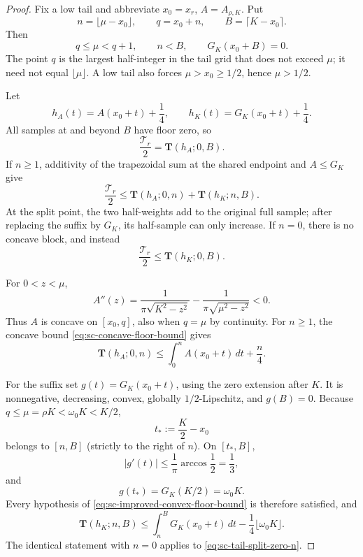 \documentclass[11pt]{article}
\numberwithin{equation}{section}
\theoremstyle{definition}
\theoremstyle{remark}
\begin{document}
\begin{proof}
Fix a low tail and abbreviate \(x_0=x_r\), \(A=A_{\rho,K}\).  Put
\begin{equation}
  n=\lfloor\mu-x_0\rfloor,
  \qquad q=x_0+n,
  \qquad B=\lceil K-x_0\rceil.
  \label{eq:sc-interface-bookkeeping}
\end{equation}
Then
\[
  q\le\mu<q+1,
  \qquad n<B,
  \qquad G_K(x_0+B)=0.
\]
The point \(q\) is the largest half-integer in the tail grid that does not
exceed \(\mu\); it need not equal \(\lfloor\mu\rfloor\).  A low tail also
forces \(\mu>x_0\ge1/2\), hence \(\mu>1/2\).

Let
\[
  h_A(t)=A(x_0+t)+\frac14,
  \qquad h_K(t)=G_K(x_0+t)+\frac14.
\]
All samples at and beyond \(B\) have floor zero, so
\[
  \frac{\mathcal T_r}{2}=\mathbf T(h_A;0,B).
\]
If \(n\ge1\), additivity of the trapezoidal sum at the shared endpoint and
\(A\le G_K\) give
\begin{equation}
  \frac{\mathcal T_r}{2}
  \le\mathbf T(h_A;0,n)+\mathbf T(h_K;n,B).
  \label{eq:sc-tail-split-positive-n}
\end{equation}
At the split point, the two half-weights add to the original full sample;
after replacing the suffix by \(G_K\), its half-sample can only increase.
If \(n=0\), there is no concave block, and instead
\begin{equation}
  \frac{\mathcal T_r}{2}\le\mathbf T(h_K;0,B).
  \label{eq:sc-tail-split-zero-n}
\end{equation}

For \(0<z<\mu\),
\begin{equation}
  A''(z)=\frac1{\pi\sqrt{K^2-z^2}}
  -\frac1{\pi\sqrt{\mu^2-z^2}}<0.
  \label{eq:sc-action-concavity}
\end{equation}
Thus \(A\) is concave on \([x_0,q]\), also when \(q=\mu\) by continuity.
For \(n\ge1\), the concave bound
\eqref{eq:sc-concave-floor-bound} gives
\begin{equation}
  \mathbf T(h_A;0,n)
  \le\int_0^nA(x_0+t)\,dt+\frac n4.
  \label{eq:sc-concave-head}
\end{equation}

For the suffix set \(g(t)=G_K(x_0+t)\), using the zero extension after
\(K\).  It is nonnegative, decreasing, convex, globally
\(1/2\)-Lipschitz, and \(g(B)=0\).  Because
\(q\le\mu=\rho K<\omega_0K<K/2\),
\[
  t_*:=\frac K2-x_0
\]
belongs to \([n,B]\) (strictly to the right of \(n\)).  On
\([t_*,B]\),
\[
  |g'(t)|\le\frac1\pi\arccos\frac12=\frac13,
\]
and
\[
  g(t_*)=G_K(K/2)=\omega_0K.
\]
Every hypothesis of \eqref{eq:sc-improved-convex-floor-bound} is therefore
satisfied, and
\begin{equation}
  \mathbf T(h_K;n,B)
  \le\int_n^BG_K(x_0+t)\,dt
  -\frac14\lfloor\omega_0K\rfloor.
  \label{eq:sc-convex-suffix}
\end{equation}
The identical statement with \(n=0\) applies to
\eqref{eq:sc-tail-split-zero-n}.


\end{proof}
\end{document}
